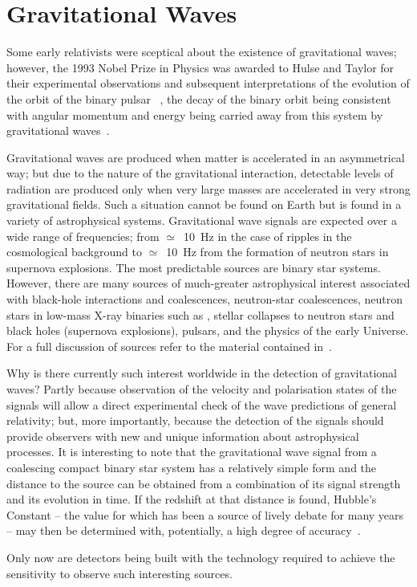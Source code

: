 \section{Gravitational Waves}
\label{section:gravwaves} 

Some early relativists were sceptical about the existence of gravitational
waves; however, the 1993 Nobel Prize in Physics was awarded to Hulse and Taylor
for their experimental observations and subsequent interpretations of the
evolution of the orbit of the binary pulsar ~\cite{Hulse, Taylor},
the decay of the binary orbit being consistent with angular momentum and energy
being carried away from this system by gravitational waves~\cite{Will}.


Gravitational waves are produced when matter is accelerated in an asymmetrical
way; but due to the nature of the gravitational interaction, detectable levels
of radiation are produced only when very large masses are accelerated in very
strong gravitational fields. Such a situation cannot be found on Earth but is
found in a variety of astrophysical systems. Gravitational wave signals are
expected over a wide range of frequencies; from $\simeq$~10~Hz in the case
of ripples in the cosmological background to $\simeq$~10~Hz from the formation
of neutron stars in supernova explosions. The most predictable sources are
binary star systems. However, there are many sources of much-greater
astrophysical interest associated with black-hole interactions and coalescences,
neutron-star coalescences, neutron stars in low-mass X-ray binaries such as
, stellar collapses to neutron stars and black holes (supernova
explosions), pulsars, and the physics of the early Universe. For a full
discussion of sources refer to the material contained in~\cite{Sathyaprakash:2009,LISAsymposium, sources, Amaldiproc}.


Why is there currently such interest worldwide in the detection of gravitational
waves? Partly because observation of the velocity and polarisation states of the
signals will allow a direct experimental check of the wave predictions of
general relativity; but, more importantly, because the detection of the signals
should provide observers with new and unique information about astrophysical
processes. It is interesting to note that the gravitational wave signal from a
coalescing compact binary star system has a relatively simple form and the
distance to the source can be obtained from a combination of its signal strength
and its evolution in time. If the redshift at that distance is found, Hubble's
Constant -- the value for which has been a source of lively debate for many
years -- may then be determined with, potentially, a high degree of
accuracy~\cite{Schutz,Holtz:2005}.


Only now are detectors being built with the technology required to achieve the
sensitivity to observe such interesting sources.


\newpage